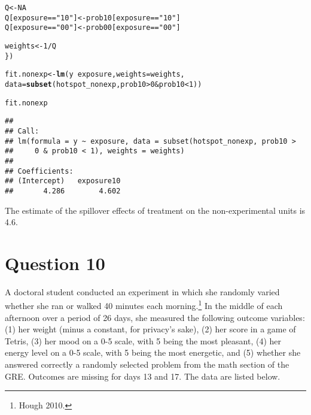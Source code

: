 \documentclass[11pt,notitlepage]{article}\usepackage[]{graphicx}\usepackage[]{color}
\makeatletter
\newcommand{\hlnum}[1]{\textcolor[rgb]{0.686,0.059,0.569}{#1}}%
\newcommand{\hlstr}[1]{\textcolor[rgb]{0.192,0.494,0.8}{#1}}%
\newcommand{\hlopt}[1]{\textcolor[rgb]{0,0,0}{#1}}%
\newcommand{\hlstd}[1]{\textcolor[rgb]{0.345,0.345,0.345}{#1}}%
\newcommand{\hlkwb}[1]{\textcolor[rgb]{0.69,0.353,0.396}{#1}}%
\newcommand{\hlkwc}[1]{\textcolor[rgb]{0.333,0.667,0.333}{#1}}%
\newcommand{\hlkwd}[1]{\textcolor[rgb]{0.737,0.353,0.396}{\textbf{#1}}}%
\newenvironment{kframe}{%
 \def\at@end@of@kframe{}%
 \ifinner\ifhmode%
  \def\at@end@of@kframe{\end{minipage}}%
  \begin{minipage}{\columnwidth}%
 \fi\fi%
 \def\FrameCommand##1{\hskip\@totalleftmargin \hskip-\fboxsep
 \colorbox{shadecolor}{##1}\hskip-\fboxsep
     \hskip-\linewidth \hskip-\@totalleftmargin \hskip\columnwidth}%
 \MakeFramed {\advance\hsize-\width
   \@totalleftmargin\z@ \linewidth\hsize
   \@setminipage}}%
 {\par\unskip\endMakeFramed%
 \at@end@of@kframe}
\newenvironment{knitrout}{}{} %
\makeatother
\begin{document}
\begin{enumerate}[a)]
\begin{knitrout}
\begin{kframe}
\begin{alltt}
  \hlstd{Q} \hlkwb{<-} \hlnum{NA}
  \hlstd{Q[exposure}\hlopt{==}\hlstr{"10"}\hlstd{]} \hlkwb{<-} \hlstd{prob10[exposure}\hlopt{==}\hlstr{"10"}\hlstd{]}
  \hlstd{Q[exposure}\hlopt{==}\hlstr{"00"}\hlstd{]} \hlkwb{<-} \hlstd{prob00[exposure}\hlopt{==}\hlstr{"00"}\hlstd{]}

  \hlstd{weights} \hlkwb{<-} \hlnum{1}\hlopt{/}\hlstd{Q}
  \hlstd{\})}

\hlstd{fit.nonexp} \hlkwb{<-} \hlkwd{lm}\hlstd{(y} \hlopt{~} \hlstd{exposure,} \hlkwc{weights}\hlstd{=weights,}
                 \hlkwc{data}\hlstd{=}\hlkwd{subset}\hlstd{(hotspot_nonexp, prob10} \hlopt{>} \hlnum{0} \hlopt{&} \hlstd{prob10} \hlopt{<} \hlnum{1}\hlstd{))}

\hlstd{fit.nonexp}
\end{alltt}
\begin{verbatim}
## 
## Call:
## lm(formula = y ~ exposure, data = subset(hotspot_nonexp, prob10 > 
##     0 & prob10 < 1), weights = weights)
## 
## Coefficients:
## (Intercept)   exposure10  
##       4.286        4.602
\end{verbatim}
\end{kframe}
\end{knitrout}
 
\end{enumerate}

The estimate of the spillover effects of treatment on the non-experimental units is 4.6.


\section*{Question 10}
A doctoral student conducted an experiment in which she randomly varied whether she ran or walked 40 minutes each morning.\footnote{Hough 2010.} In the middle of each afternoon over a period of 26 days, she measured the following outcome variables: (1) her weight (minus a constant, for privacy's sake), (2) her score in a game of Tetris, (3) her mood on a 0-5 scale, with 5 being the most pleasant, (4) her energy level on a 0-5 scale, with 5 being the most energetic, and (5) whether she answered correctly a randomly selected problem from the math section of the GRE. Outcomes are missing for days 13 and 17. The data are listed below.
\end{document}
